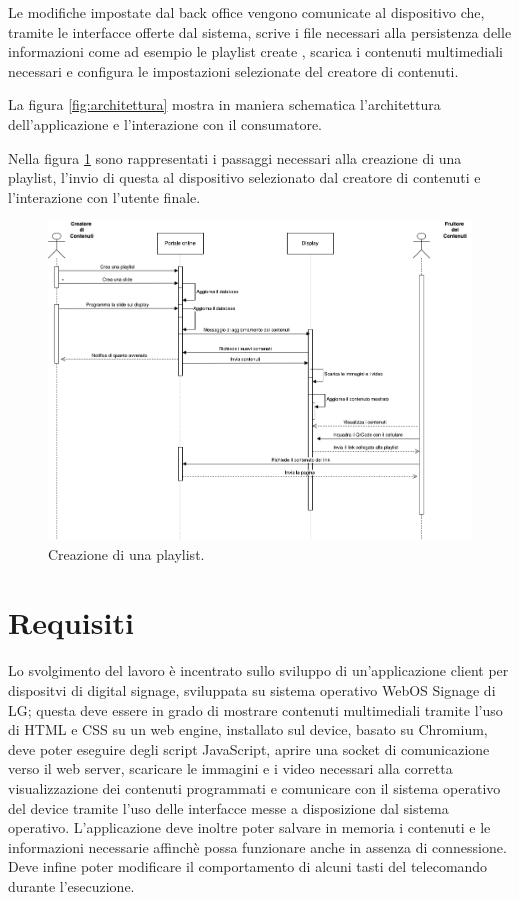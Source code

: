 Le modifiche impostate dal back office vengono comunicate al dispositivo che, tramite le interfacce offerte dal sistema, scrive i file necessari alla persistenza delle informazioni come ad esempio le playlist create , scarica i contenuti multimediali necessari e configura le impostazioni selezionate del creatore di contenuti.

La figura \ref*{fig:architettura} mostra in maniera schematica l'architettura dell'applicazione e l'interazione con il consumatore.

Nella figura \ref*{fig:use_case} sono rappresentati i passaggi necessari alla creazione di una playlist, l'invio di questa al dispositivo selezionato dal creatore di contenuti e l'interazione con l'utente finale.

\begin{figure}[H]
    \centering
    \includegraphics[width= 1.1\textwidth]{images/Introduzione/diagramma_flusso.png} 
    \caption{Creazione di una playlist.} 
    \label{fig:use_case}
\end{figure}



\section{Requisiti}
Lo svolgimento del lavoro è incentrato sullo sviluppo di un'applicazione client per dispositvi di digital signage, sviluppata su sistema operativo WebOS Signage di LG; questa deve essere in grado di mostrare contenuti multimediali tramite l'uso di HTML e CSS su un web engine, installato sul device, basato su Chromium, deve poter eseguire degli script JavaScript, aprire una socket di comunicazione verso il web server, scaricare le immagini e i video necessari alla corretta visualizzazione dei contenuti programmati e comunicare con il sistema operativo del device tramite l'uso delle interfacce messe a disposizione dal sistema operativo.
L'applicazione deve inoltre poter salvare in memoria i contenuti e le informazioni necessarie affinchè possa funzionare anche in assenza di connessione. Deve infine poter modificare il comportamento di alcuni tasti del telecomando durante l'esecuzione.

